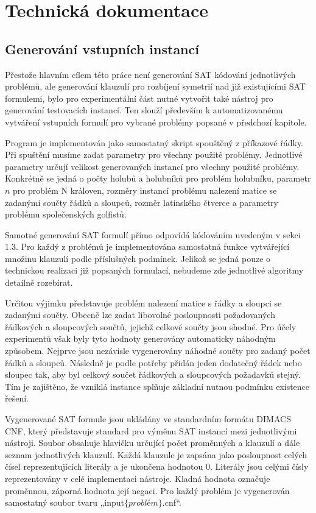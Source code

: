 
\chapter{Technická dokumentace}
\section{Generování vstupních instancí}

Přestože hlavním cílem této práce není generování SAT kódování jednotlivých problémů, ale generování klauzulí pro rozbíjení symetrií nad již existujícími SAT formulemi, bylo pro experimentální část nutné vytvořit také nástroj pro generování testovacích instancí. Ten slouží především k automatizovanému vytváření vstupních formulí pro vybrané problémy popsané v předchozí kapitole.

Program je implementován jako samostatný skript spouštěný z příkazové řádky. Při spuštění musíme zadat parametry pro všechny použité problémy. Jednotlivé parametry určují velikost generovaných instancí pro všechny použité problémy. Konkrétně se jedná o počty holubů a holubníků pro problém holubníku, parametr $n$ pro problém N královen, rozměry instancí problému nalezení matice se zadanými součty řádků a sloupců, rozměr latinského čtverce a parametry problému společenských golfistů. 

Samotné generování SAT formulí přímo odpovídá kódováním uvedeným v sekci 1.3. Pro každý z problémů je implementována samostatná funkce vytvářející množinu klauzulí podle příslušných podmínek. Jelikož se jedná pouze o technickou realizaci již popsaných formulací, nebudeme zde jednotlivé algoritmy detailně rozebírat.

Určitou výjimku představuje problém nalezení matice s řádky a sloupci se zadanými součty. Obecně lze zadat libovolné posloupnosti požadovaných řádkových a sloupcových součtů, jejichž celkové součty jsou shodné. Pro účely experimentů však byly tyto hodnoty generovány automaticky náhodným způsobem. Nejprve jsou nezávisle vygenerovány náhodné součty pro zadaný počet řádků a sloupců. Následně je podle potřeby přidán jeden dodatečný řádek nebo sloupec tak, aby byl celkový součet řádkových a sloupcových požadavků stejný. Tím je zajištěno, že vzniklá instance splňuje základní nutnou podmínku existence řešení.

Vygenerované SAT formule jsou ukládány ve standardním formátu DIMACS CNF, který představuje standard pro výměnu SAT instancí mezi jednotlivými nástroji. Soubor obsahuje hlavičku určující počet proměnných a klauzulí a dále seznam jednotlivých klauzulí. Každá klauzule je zapsána jako posloupnost celých čísel reprezentujících literály a je ukončena hodnotou $0$. Literály jsou celými čísly reprezentovány v celé implementaci nástroje. Kladná hodnota označuje proměnnou, záporná hodnota její negaci. Pro každý problém je vygenerován samostatný soubor tvaru „input$\{problém\}$.cnf“.

